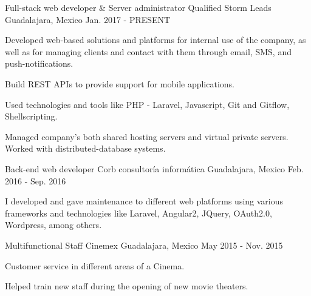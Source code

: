 \begin{cventries}
  \cventry
    {Full-stack web developer \& Server administrator}
    {Qualified Storm Leads}
    {Guadalajara, Mexico}
    {Jan. 2017 - PRESENT}
    {
      \begin{cvitems}
        \item {Developed web-based solutions and platforms for internal use of the company, as well as for managing clients and contact with them through email, SMS, and push-notifications.}
        \item {Build REST APIs to provide support for mobile applications.}
        \item {Used technologies and tools like PHP - Laravel, Javascript, Git and Gitflow, Shellscripting.}
        \item {Managed company's both shared hosting servers and virtual private servers. Worked with distributed-database systems.}
      \end{cvitems}
    }
  \cventry
    {Back-end web developer}
    {Corb consultoría informática}
    {Guadalajara, Mexico}
    {Feb. 2016 - Sep. 2016}
    {
      \begin{cvitems}
        \item {I developed and gave maintenance to different web platforms using various frameworks and technologies like Laravel, Angular2, JQuery, OAuth2.0, Wordpress, among others.}
      \end{cvitems}
    }
  \cventry
    {Multifunctional Staff}
    {Cinemex}
    {Guadalajara, Mexico}
    {May 2015 - Nov. 2015}
    {
      \begin{cvitems}
        \item {Customer service in different areas of a Cinema.}
        \item {Helped train new staff during the opening of new movie theaters.}
      \end{cvitems}
    }
\end{cventries}
